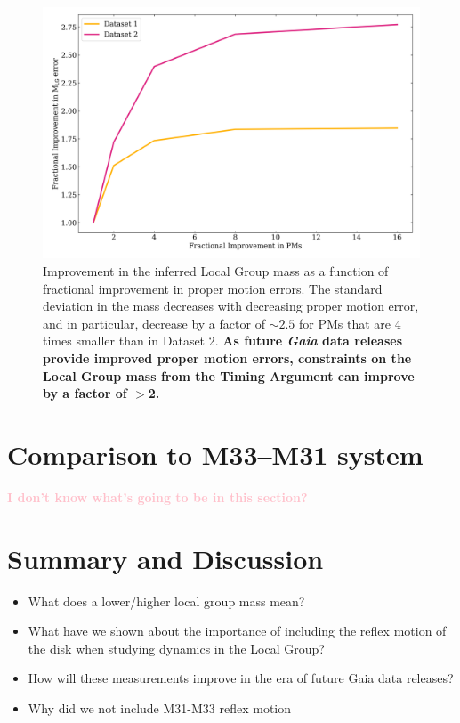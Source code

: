 \documentclass[twocolumn]{aastex631}
\newcommand{\kc}[1]{\textcolor{pink}{\textbf{#1}} }
\begin{document}
\begin{figure}[htb]
    \centering
    \includegraphics[width=\columnwidth]{analyze-runs-deltaMvsPM.png}
    \caption{\label{fig:mvspm} Improvement in the inferred Local Group mass as a function of fractional improvement in proper motion errors. The standard deviation in the mass decreases with decreasing proper motion error, and in particular, decrease by a factor of $\sim2.5$ for PMs that are 4 times smaller than in Dataset 2. \textbf{As future \textit{Gaia} data releases provide improved proper motion errors, constraints on the Local Group mass from the Timing Argument can improve by a factor of $>$2.}
    }
\end{figure}


\section{Comparison to M33--M31 system}
\kc{I don't know what's going to be in this section?}

\section{Summary and Discussion}
\label{sec:discussion}
\begin{itemize}
  \item What does a lower/higher local group mass mean? 
  \item What have we shown about the importance of including the reflex motion of the disk when studying dynamics in the Local Group? 
  \item How will these measurements improve in the era of future Gaia data releases?
  \item Why did we not include M31-M33 reflex motion

\end{itemize}
\end{document}
